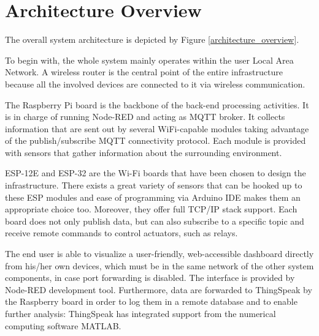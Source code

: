 \section{Architecture Overview}
The overall system architecture is depicted by Figure \ref{architecture_overview}.

To begin with, the whole system mainly operates within the user Local Area Network. A wireless router is the central point of the entire infrastructure because all the involved devices are connected to it via wireless communication.

The Raspberry Pi board is the backbone of the back-end processing activities. It is in charge of running Node-RED and acting as MQTT broker. It collects information that are sent out by several WiFi-capable modules taking advantage of the publish/subscribe MQTT connectivity protocol. Each module is provided with sensors that gather information about the surrounding environment.

ESP-12E and ESP-32 are the Wi-Fi boards that have been chosen to design the infrastructure. There exists a great variety of sensors that can be hooked up to these ESP modules and ease of programming via Arduino IDE makes them an appropriate choice too. Moreover, they offer full TCP/IP stack support.
Each board does not only publish data, but can also subscribe to a specific topic and receive remote commands to control actuators, such as relays.

The end user is able to visualize a user-friendly, web-accessible dashboard directly from his/her own devices, which must be in the same network of the other system components, in case port forwarding is disabled. The interface is provided by Node-RED development tool. Furthermore, data are forwarded to ThingSpeak by the Raspberry board in order to log them in a remote database and to enable further analysis: ThingSpeak has integrated support from the numerical computing software MATLAB.

